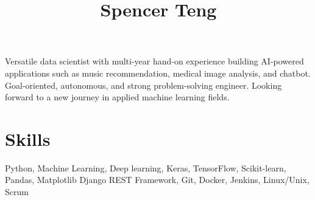 \documentclass[11pt]{article} %
\begin{document}
{\selectfont



\hspace{-1.2em}\title{ Spencer Teng } %

\noindent\begin{minipage}[t]{0.8\textwidth}
\vspace{1em}

Versatile data scientist with multi-year hand-on experience building AI-powered applications such
as music recommendation, medical image analysis, and chatbot. Goal-oriented, autonomous,
and strong problem-solving engineer. Looking forward to a new journey in applied machine
learning fields.


\section{Skills}
%

Python, Machine Learning, Deep learning, Keras, TensorFlow, Scikit-learn, Pandas, Matplotlib 
Django REST Framework, Git, Docker, Jenkins, Linux/Unix, Scrum


\end{minipage}}
\end{document}
